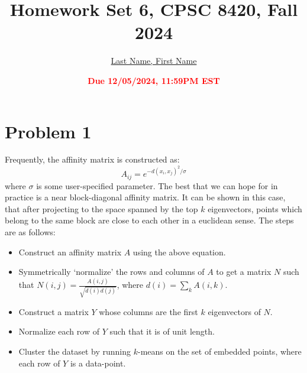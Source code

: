 \documentclass[11pt]{article}
\title{{\bf Homework Set 6, CPSC 8420, Fall 2024}} %
\author{\Large\underline{Last Name, First Name}}
\date{\textbf{\Large\textcolor{red}{Due 12/05/2024, 11:59PM EST}}} %
\begin{document}
\maketitle


\section*{Problem 1}
Frequently, the affinity matrix is constructed as:
\begin{equation}
	A_{ij}=e^{-d(x_i,x_j)^2/\sigma}
\end{equation}
where $\sigma$  is some user-specified parameter. The best that we can hope for in practice is a near block-diagonal
affinity matrix. It can be shown in this case, that after projecting to the space spanned by the top $k$
eigenvectors, points which belong to the same block are close to each other in a euclidean sense. The steps are as follows:
\begin{itemize}
	\item Construct an affinity matrix $A$ using the above equation.
	\item Symmetrically `normalize’ the rows and columns of $A$ to get a matrix $N$ such that $N(i,j)=\frac{A(i,j)}{\sqrt{d(i)d(j)}}$, where $d(i)=\sum_k A(i,k)$.
	\item Construct a matrix $Y$ whose columns are the first $k$ eigenvectors of $N$.
	\item Normalize each row of $Y$ such that it is of unit length.
	\item Cluster the dataset by running $k$-means on the set of  embedded points, where each row of $Y$ is a data-point.
\end{itemize}
\end{document}
